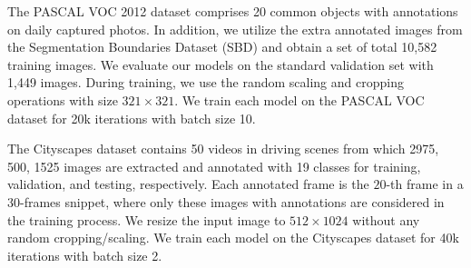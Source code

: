 \documentclass{bmvc2k}
\begin{document}
	The PASCAL VOC 2012 dataset comprises 20 common objects with annotations on daily captured photos.
	In addition, we utilize the extra annotated images from the Segmentation Boundaries Dataset (SBD) \cite{sbd} and obtain a set of total 10,582 training images. 
	We evaluate our models on the standard validation set with 1,449 images.
	During training, we use the random scaling and cropping operations with size $321 \times 321$.
	We train each model on the PASCAL VOC dataset for 20k iterations with batch size 10.
	
	The Cityscapes dataset contains 50 videos in driving scenes from which 
	2975, 500, 1525 images are extracted and annotated with 19 classes for training, validation, and testing, respectively.
	Each annotated frame is the $20$-{th} frame in a 30-frames snippet, where only these images with annotations are considered in the training process.
	We resize the input image to $512 \times 1024$ without any random cropping/scaling.
	We train each model on the Cityscapes dataset for 40k iterations with batch size 2.
	
\end{document}
